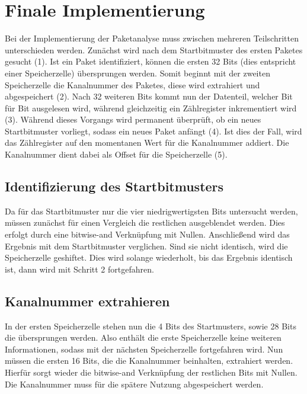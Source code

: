 \documentclass[12pt,titlepage,german,a4]{article}
\begin{document}
    \newpage

    \section{Finale Implementierung}

    Bei der Implementierung der Paketanalyse muss zwischen mehreren Teilschritten unterschieden werden. Zun{\"a}chst wird nach dem Startbitmuster des ersten Paketes gesucht (1). Ist ein Paket identifiziert, k{\"o}nnen die ersten 32 Bits (dies entspricht einer Speicherzelle) {\"u}bersprungen werden. Somit beginnt mit der zweiten Speicherzelle die Kanalnummer des Paketes, diese wird extrahiert und abgespeichert (2). Nach 32 weiteren Bits kommt nun der Datenteil, welcher Bit f{\"u}r Bit ausgelesen wird, w{\"a}hrend gleichzeitig ein Z{\"a}hlregister inkrementiert wird (3). W{\"a}hrend dieses Vorgangs wird permanent {\"u}berpr{\"u}ft, ob ein neues Startbitmuster vorliegt, sodass ein neues Paket anf{\"a}ngt (4). Ist dies der Fall, wird das Z{\"a}hlregister auf den momentanen Wert f{\"u}r die Kanalnummer addiert. Die Kanalnummer dient dabei als Offset f{\"u}r die Speicherzelle (5).

    \subsection{Identifizierung des Startbitmusters}
    Da f{\"u}r das Startbitmuster nur die vier niedrigwertigsten Bits untersucht werden, m{\"u}ssen zun{\"a}chst f{\"u}r einen Vergleich die restlichen ausgeblendet werden. Dies erfolgt durch eine bitwise-and Verkn{\"u}pfung mit Nullen. Anschlie{\ss}end wird das Ergebnis mit dem Startbitmuster verglichen. Sind sie nicht identisch, wird die Speicherzelle geshiftet. Dies wird solange wiederholt, bis das Ergebnis identisch ist, dann wird mit Schritt 2 fortgefahren.

    \subsection{Kanalnummer extrahieren}
    In der ersten Speicherzelle stehen nun die 4 Bits des Startmusters, sowie 28 Bits die {\"u}bersprungen werden. Also enth{\"a}lt die erste Speicherzelle keine weiteren Informationen, sodass mit der n{\"a}chsten Speicherzelle fortgefahren wird. Nun m{\"u}ssen die ersten 16 Bits, die die Kanalnummer beinhalten, extrahiert werden. Hierf{\"u}r sorgt wieder die bitwise-and Verkn{\"u}pfung der restlichen Bits mit Nullen. Die Kanalnummer muss f{\"u}r die sp{\"a}tere Nutzung abgespeichert werden.
\end{document}
